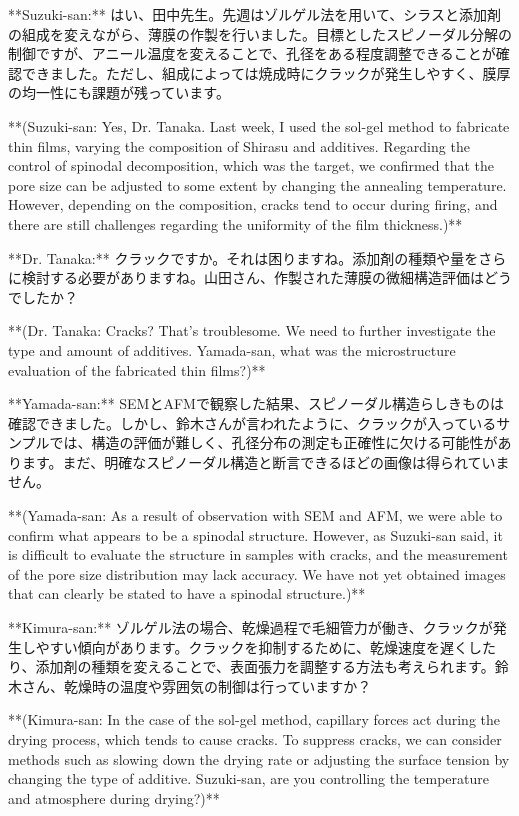 \documentclass{article}
\begin{document}
**Suzuki-san:** はい、田中先生。先週はゾルゲル法を用いて、シラスと添加剤の組成を変えながら、薄膜の作製を行いました。目標としたスピノーダル分解の制御ですが、アニール温度を変えることで、孔径をある程度調整できることが確認できました。ただし、組成によっては焼成時にクラックが発生しやすく、膜厚の均一性にも課題が残っています。

**(Suzuki-san: Yes, Dr. Tanaka. Last week, I used the sol-gel method to fabricate thin films, varying the composition of Shirasu and additives. Regarding the control of spinodal decomposition, which was the target, we confirmed that the pore size can be adjusted to some extent by changing the annealing temperature. However, depending on the composition, cracks tend to occur during firing, and there are still challenges regarding the uniformity of the film thickness.)**

**Dr. Tanaka:** クラックですか。それは困りますね。添加剤の種類や量をさらに検討する必要がありますね。山田さん、作製された薄膜の微細構造評価はどうでしたか？

**(Dr. Tanaka: Cracks? That's troublesome. We need to further investigate the type and amount of additives. Yamada-san, what was the microstructure evaluation of the fabricated thin films?)**

**Yamada-san:** SEMとAFMで観察した結果、スピノーダル構造らしきものは確認できました。しかし、鈴木さんが言われたように、クラックが入っているサンプルでは、構造の評価が難しく、孔径分布の測定も正確性に欠ける可能性があります。まだ、明確なスピノーダル構造と断言できるほどの画像は得られていません。

**(Yamada-san: As a result of observation with SEM and AFM, we were able to confirm what appears to be a spinodal structure. However, as Suzuki-san said, it is difficult to evaluate the structure in samples with cracks, and the measurement of the pore size distribution may lack accuracy. We have not yet obtained images that can clearly be stated to have a spinodal structure.)**

**Kimura-san:** ゾルゲル法の場合、乾燥過程で毛細管力が働き、クラックが発生しやすい傾向があります。クラックを抑制するために、乾燥速度を遅くしたり、添加剤の種類を変えることで、表面張力を調整する方法も考えられます。鈴木さん、乾燥時の温度や雰囲気の制御は行っていますか？

**(Kimura-san: In the case of the sol-gel method, capillary forces act during the drying process, which tends to cause cracks. To suppress cracks, we can consider methods such as slowing down the drying rate or adjusting the surface tension by changing the type of additive. Suzuki-san, are you controlling the temperature and atmosphere during drying?)**
\end{document}
